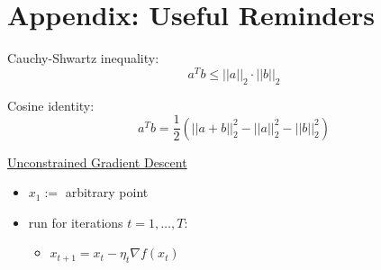 \documentclass[11pt]{article}
\begin{document}
\section{Appendix: Useful Reminders}

Cauchy-Shwartz inequality:
\[
    a^Tb \leq ||a||_2 \cdot ||b||_2
\]

Cosine identity:
\[
    a^Tb = \frac{1}{2}(||a + b||^2_2 - ||a||_2^2 - ||b||_2^2)
\]

\begin{mdframed}[backgroundcolor=blue!05,topline=false,bottomline=false,leftline=false,rightline=false] \underline{\sc Unconstrained Gradient Descent}
\begin{itemize}
\item $x_1 := $ arbitrary point
\item run for iterations $t=1,\ldots, T$:
\begin{itemize}
    \item $x_{t+1} = x_t- \eta_t\nabla f(x_t)$
\end{itemize} 

\end{itemize}
\end{mdframed}
\end{document}
